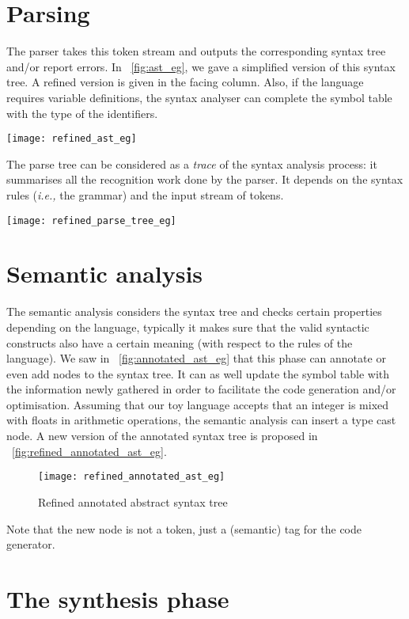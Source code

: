 \section*{Parsing}

The parser takes this token stream and outputs the corresponding
syntax tree and/or report errors. In \fig~\vref{fig:ast_eg}, we gave a
simplified version of this syntax tree. A refined version is given in
the facing column. Also, if the language requires variable
definitions, the syntax analyser can complete the symbol table with
the type of the identifiers.
\begin{center}
  \texttt{[image: refined\_ast\_eg]}
\end{center}
The parse tree can be considered as a \emph{trace} of the syntax
analysis process: it summarises all the recognition work done by the
parser. It depends on the syntax rules (\emph{i.e.,} the grammar) and
the input stream of tokens.
\begin{center}
\texttt{[image: refined\_parse\_tree\_eg]}
\end{center}

\section*{Semantic analysis}

The semantic analysis considers the syntax tree and checks certain
properties depending on the language, typically it makes sure that the
valid syntactic constructs also have a certain meaning (with respect
to the rules of the language). We saw in \fig~\vref{fig:annotated_ast_eg} that
this phase can annotate or even add nodes to the syntax tree. It can
as well update the symbol table with the information newly gathered in
order to facilitate the code generation and/or optimisation. Assuming
that our toy language accepts that an integer is mixed with floats in
arithmetic operations, the semantic analysis can insert a type cast
node. A new version of the annotated syntax tree is proposed in \fig~\vref{fig:refined_annotated_ast_eg}.
\begin{figure}[b]
\centering
\texttt{[image: refined\_annotated\_ast\_eg]}
\caption{Refined annotated abstract syntax tree\label{fig:refined_annotated_ast_eg}}
\end{figure}
Note that the new node is not a token, just a (semantic) tag for the
code generator.

\section*{The synthesis phase}


